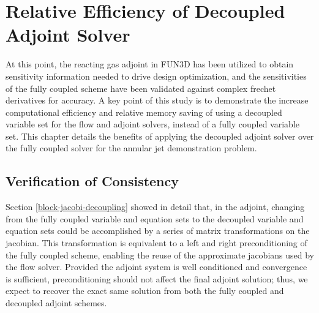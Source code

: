 \chapter{Relative Efficiency of Decoupled Adjoint Solver}
\label{chapter-nine}

At this point, the reacting gas adjoint in FUN3D has been utilized to obtain
sensitivity information needed to drive design optimization, and the
sensitivities of the fully coupled scheme have been validated against complex
frechet derivatives for accuracy.  A key point of this study is to demonstrate
the increase computational efficiency and relative memory saving of using a
decoupled variable set for the flow and adjoint solvers, instead of a fully
coupled variable set.  This chapter details the benefits of applying the
decoupled adjoint solver over the fully coupled solver for the annular jet
demonstration problem.

\section{Verification of Consistency}
\label{adj-consistency}

Section \ref{block-jacobi-decoupling} showed in detail that, in the adjoint,
changing from the fully coupled variable and equation sets to the decoupled
variable and equation sets could be accomplished by a series of matrix
transformations on the jacobian.  This transformation is equivalent to a left
and right preconditioning of the fully coupled scheme, enabling the reuse of the
approximate jacobians used by the flow solver.  Provided the adjoint system is
well conditioned and convergence is sufficient, preconditioning should not
affect the final adjoint solution; thus, we expect to recover the exact same
solution from both the fully coupled and decoupled adjoint schemes.

